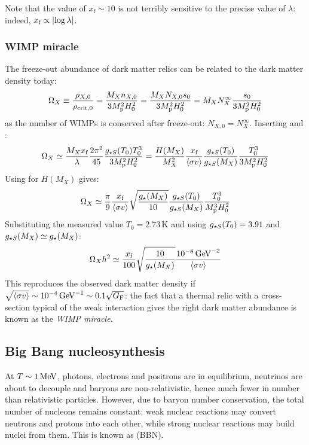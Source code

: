 Note that the value of $ x_\text{f} \sim 10 $ is not terribly sensitive to the precise value of $ \lambda $: indeed, $ x_\text{f} \propto \left\lvert\log \lambda\right\rvert $.

\subsubsection{WIMP miracle}

The freeze-out abundance of dark matter relics can be related to the dark matter density today:
\begin{equation*}
  \Omega_X \equiv \frac{\rho_{X,0}}{\rho_{\text{crit},0}} = \frac{M_X n_{X,0}}{3 M_\text{p}^2 H_0^2} = \frac{M_X N_{X,0} s_0}{3 M_\text{p}^2 H_0^2} = M_X N_X^\infty \frac{s_0}{3M_\text{p}^2 H_0^2}
\end{equation*}
as the number of WIMPs is conserved after freeze-out: $ N_{X,0} = N_X^\infty $. Inserting  and :
\begin{equation*}
  \Omega_X \simeq \frac{M_X x_\text{f}}{\lambda} \frac{2\pi^2}{45} \frac{g_{\star S}(T_0) T_0^3}{3M_\text{p}^2 H_0^2} = \frac{H(M_X)}{M_X^2} \frac{x_\text{f}}{\braket{\sigma v}} \frac{g_{\star S}(T_0)}{g_{\star S}(M_X)} \frac{T_0^3}{3M_\text{p}^2 H_0^2}
\end{equation*}
Using  for $ H(M_X) $ gives:
\begin{equation}
  \Omega_X \simeq \frac{\pi}{9} \frac{x_\text{f}}{\braket{\sigma v}} \sqrt{\frac{g_\star(M_X)}{10}} \frac{g_{\star S}(T_0)}{g_{\star S}(M_X)} \frac{T_0^3}{M_\text{p}^3 H_0^2}
\end{equation}
Substituting the measured value $ T_0 = 2.73 \,\text{K} $ and using $ g_{\star S}(T_0) = 3.91 $ and $ g_{\star S}(M_X) \simeq g_\star(M_X) $:
\begin{equation*}
  \Omega_X h^2 \simeq \frac{x_\text{f}}{100} \sqrt{\frac{10}{g_\star(M_X)}} \frac{10^{-8} \,\mathrm{GeV}^{-2}}{\braket{\sigma v}}
\end{equation*}
This reproduces the observed dark matter density if $ \sqrt{\braket{\sigma v}} \sim 10^{-4} \,\mathrm{GeV}^{-1} \sim 0.1 \sqrt{G_\text{F}} $: the fact that a thermal relic with a cross-section typical of the weak interaction gives the right dark matter abundance is known as the \emph{WIMP miracle}.

\subsection{Big Bang nucleosynthesis}

At $ T \sim 1 \,\mathrm{MeV} $, photons, electrons and positrons are in equilibrium, neutrinos are about to decouple and baryons are non-relativistic, hence much fewer in number than relativistic particles. However, due to baryon number conservation, the total number of nucleons remains constant: weak nuclear reactions may convert neutrons and protons into each other, while strong nuclear reactions may build nuclei from them. This is known as  (BBN).

